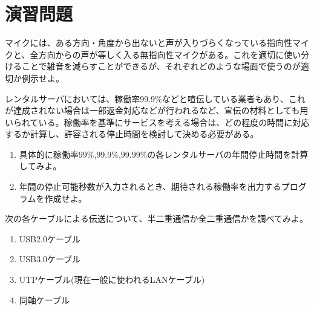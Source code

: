 \section*{演習問題}
\begin{problems}
\item マイクには、ある方向・角度から出ないと声が入りづらくなっている指向性マイクと、全方向からの声が等しく入る無指向性マイクがある。これを適切に使い分けることで雑音を減らすことができるが、それぞれどのような場面で使うのが適切か例示せよ。

\item レンタルサーバにおいては、稼働率99.9\%などと喧伝している業者もあり、これが達成されない場合は一部返金対応などが行われるなど、宣伝の材料としても用いられている。稼働率を基準にサービスを考える場合は、どの程度の時間に対応するか計算し、許容される停止時間を検討して決める必要がある。
\begin{enumerate}
\item 具体的に稼働率99\%,99.9\%,99.99\%の各レンタルサーバの年間停止時間を計算してみよ。
\item 年間の停止可能秒数が入力されるとき、期待される稼働率を出力するプログラムを作成せよ。
\end{enumerate}

\item 次の各ケーブルによる伝送について、半二重通信か全二重通信かを調べてみよ。
\begin{enumerate}
\item USB2.0ケーブル
\item USB3.0ケーブル
\item UTPケーブル(現在一般に使われるLANケーブル)
\item 同軸ケーブル
\end{enumerate}

\end{problems}
